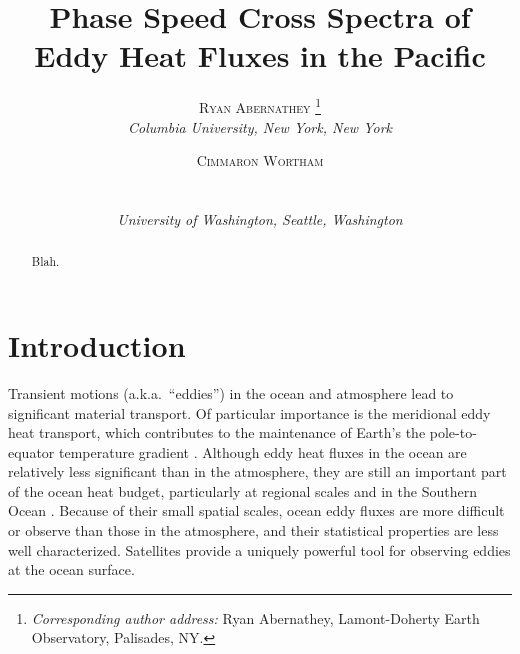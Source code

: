 \documentclass[10pt]{article}
\newcommand{\myabstract}{Blah.}
\begin{document}
%
%
\title{\textbf{\large{Phase Speed Cross Spectra of Eddy Heat Fluxes in the Pacific}}}
%
%
\author{\textsc{Ryan Abernathey}
				\thanks{\textit{Corresponding author address:} 
				Ryan Abernathey, Lamont-Doherty Earth Observatory, 
				Palisades, NY. 
				}\\
\textit{\footnotesize{Columbia University, New York, New York}}
\and 
\centerline{\textsc{Cimmaron Wortham}}\\%
\centerline{\textit{\footnotesize{University of Washington, Seattle, Washington}}}
}
%
{
\twocolumn[
\begin{@twocolumnfalse}
\amstitle

\begin{center}
\begin{minipage}{13.0cm}
\begin{abstract}
	\myabstract
	\newline
	\begin{center}
		\rule{38mm}{0.2mm}
	\end{center}
\end{abstract}
\end{minipage}
\end{center}
\end{@twocolumnfalse}
]
}
{
\amstitle

\begin{abstract}
\myabstract
\end{abstract}

\newpage
}

\section{Introduction}

Transient motions (a.k.a.~``eddies'') in the ocean and atmosphere lead to significant material transport. Of particular importance is the meridional eddy heat transport, which contributes to the maintenance of Earth's the pole-to-equator temperature gradient \citep{TrenberthCaron2001,Wunsch2005}. Although eddy heat fluxes in the ocean are relatively less significant than in the atmosphere, they are still an important part of the ocean heat budget, particularly at regional scales and in the Southern Ocean \citep{JayneMarotzke2002,WhatElse?}. Because of their small spatial scales, ocean eddy fluxes are more difficult or observe than those in the atmosphere, and their statistical properties are less well characterized. Satellites provide a uniquely powerful tool for observing eddies at the ocean surface.
\end{document}

